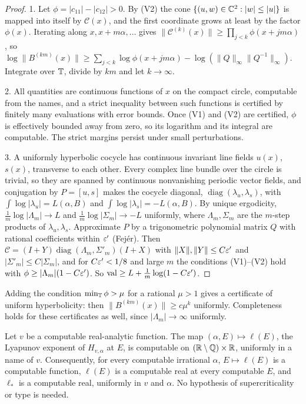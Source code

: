 \begin{proof}
1. Let $\phi=|c_{11}|-|c_{12}|>0$. By (V2) the cone $\{(u,w)\in\mathbb C^2:|w|\le|u|\}$ is mapped into itself by $\mathcal C(x)$, and the first coordinate grows at least by the factor $\phi(x)$. Iterating along $x,x+m\alpha,\dots$ gives $\|\mathcal C^{(k)}(x)\|\ge\prod_{j<k}\phi(x+jm\alpha)$, so $\log\|B^{(km)}(x)\|\ge\sum_{j<k}\log\phi(x+jm\alpha)-\log(\|Q\|_\infty\|Q^{-1}\|_\infty)$. Integrate over $\mathbb T$, divide by $km$ and let $k\to\infty$.

2. All quantities are continuous functions of $x$ on the compact circle, computable from the names, and a strict inequality between such functions is certified by finitely many evaluations with error bounds. Once (V1) and (V2) are certified, $\phi$ is effectively bounded away from zero, so its logarithm and its integral are computable. The strict margins persist under small perturbations.

3. A uniformly hyperbolic cocycle has continuous invariant line fields $u(x)$, $s(x)$, transverse to each other. Every complex line bundle over the circle is trivial, so they are spanned by continuous nonvanishing periodic vector fields, and conjugation by $P=[u,s]$ makes the cocycle diagonal, $\operatorname{diag}(\lambda_u,\lambda_s)$, with $\int\log|\lambda_u|=L(\alpha,B)$ and $\int\log|\lambda_s|=-L(\alpha,B)$. By unique ergodicity, $\frac1m\log|\Lambda_m|\to L$ and $\frac1m\log|\Sigma_m|\to-L$ uniformly, where $\Lambda_m,\Sigma_m$ are the $m$-step products of $\lambda_u,\lambda_s$. Approximate $P$ by a trigonometric polynomial matrix $Q$ with rational coefficients within $\varepsilon'$ (Fej\'er). Then $\mathcal C=(I+Y)\operatorname{diag}(\Lambda_m,\Sigma'_m)(I+X)$ with $\|X\|,\|Y\|\le C\varepsilon'$ and $|\Sigma'_m|\le C|\Sigma_m|$, and for $C\varepsilon'<1/8$ and large $m$ the conditions (V1)--(V2) hold with $\phi\ge|\Lambda_m|(1-C\varepsilon')$. So $\mathrm{val}\ge L+\frac1m\log(1-C\varepsilon')$.
\end{proof}

Adding the condition $\min_\mathbb T\phi>\mu$ for a rational $\mu>1$ gives a certificate of uniform hyperbolicity: then $\|B^{(km)}(x)\|\ge c\mu^k$ uniformly. Completeness holds for these certificates as well, since $|\Lambda_m|\to\infty$ uniformly.

\begin{theorem}\label{thm:LEcomp}
Let $v$ be a computable real-analytic function. The map $(\alpha,E)\mapsto\ell(E)$, the Lyapunov exponent of $H_{v,\alpha}$ at $E$, is computable on $(\mathbb R\setminus\mathbb Q)\times\mathbb R$, uniformly in a name of $v$. Consequently, for every computable irrational $\alpha$, $E\mapsto\ell(E)$ is a computable function, $\ell(E)$ is a computable real at every computable $E$, and $\ell_*$ is a computable real, uniformly in $v$ and $\alpha$. No hypothesis of supercriticality or type is needed.
\end{theorem}

